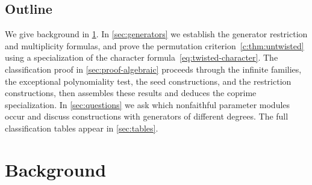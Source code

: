\documentclass[10pt,a4paper]{amsart}
\theoremstyle{definition}
\begin{document}
 

%



%

\subsection{Outline}
We give background in \cref{sec:background}. In \cref{sec:generators}
we establish the generator restriction and multiplicity formulas, and
prove the permutation criterion~\cref{c:thm:untwisted} using a
specialization of the character formula~\cref{eq:twisted-character}. The classification proof
in \cref{sec:proof-algebraic} proceeds through the infinite families,
the exceptional polynomiality test, the seed constructions, and the
restriction constructions, then assembles these results and deduces
the coprime specialization. In \cref{sec:questions} we ask which
nonfaithful parameter modules occur and discuss constructions with
generators of different degrees. The full classification tables
appear in \cref{sec:tables}.


\section{Background}\label{sec:background}
\end{document}
